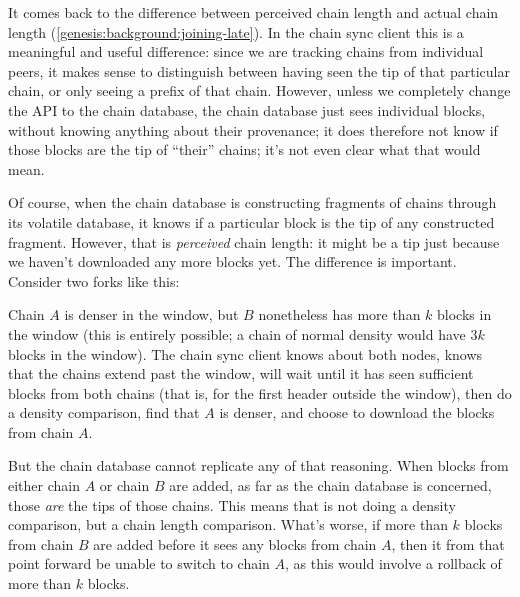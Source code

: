 It comes back to the difference between perceived chain length and actual chain
length (\cref{genesis:background:joining-late}). In the chain sync client this
is a meaningful and useful difference: since we are tracking chains from
individual peers, it makes sense to distinguish between having seen the tip of
that particular chain, or only seeing a prefix of that chain. However, unless we
completely change the API to the chain database, the chain database just sees
individual blocks, without knowing anything about their provenance;  it  does
therefore not know if those blocks are the tip of ``their'' chains; it's not
even clear what that would mean.

Of course, when the chain database is constructing fragments of chains through
its volatile database, it knows if a particular block is the tip of any
constructed fragment. However, that is \emph{perceived} chain length: it might
be a tip just because we haven't downloaded any more blocks yet. The difference
is important. Consider two forks like this:
%
\begin{center}
\end{center}
%
Chain $A$ is denser in the window, but $B$ nonetheless has more than $k$ blocks
in the window (this is entirely possible; a chain of normal density would have
$3k$ blocks in the window).  The chain sync client knows about both nodes, knows
that the chains extend past the window, will wait until it has seen sufficient
blocks from both chains (that is, for the first header outside the window), then
do a density comparison, find that $A$ is denser, and choose to download the
blocks from chain $A$.

But the chain database cannot replicate any of that reasoning. When blocks  from
either chain $A$ or chain $B$ are added, as far as the chain database is
concerned, those \emph{are} the tips of those chains. This means that is not
doing a density comparison, but a chain length comparison. What's worse, if more
than $k$ blocks from chain $B$ are added before it sees any blocks from chain
$A$, then it from that point forward be unable to switch to chain $A$, as this
would involve a rollback of more than $k$ blocks.

